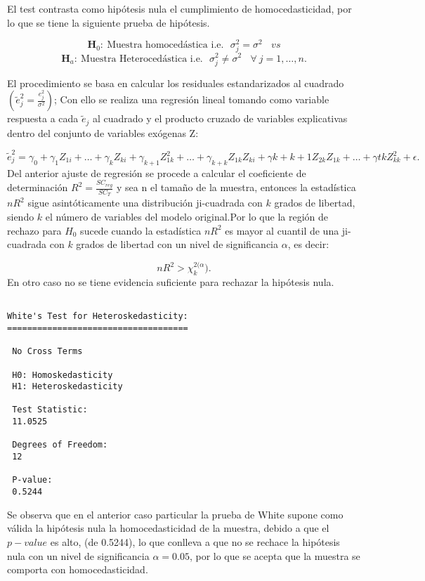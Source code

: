 \documentclass[
  a4paper,
  oneside,
  openany]{book}
\begin{document}
El test contrasta como hipótesis nula el cumplimiento de homocedasticidad, por lo que se tiene la siguiente prueba de hipótesis.

\[\textbf{H}_0: \  \mbox{Muestra homocedástica  i.e.}  \ \ \  \sigma^2_{j}=\sigma^2 \ \ \ \ vs \]
\[\textbf{H}_a: \  \mbox{Muestra Heterocedástica i.e.}  \ \ \  \sigma^2_{j} \neq \sigma^2  \ \ \ \ \forall  \ j = 1,\ldots,n.\]

El procedimiento se basa en calcular los residuales estandarizados al cuadrado \(\left( \tilde{e}^2_{j}=\frac{e^2_{j}}{\sigma^2}\right)\); Con ello se realiza una regresión lineal tomando como variable respuesta a cada \(\tilde{e}_{j}\) al cuadrado y el producto cruzado de variables explicativas dentro del conjunto de variables exógenas Z:

\[\tilde{e}_{j}^{2}=\gamma_{0}+\gamma_{1}Z_{1i}+ \ldots + \gamma_{k}Z_{ki}+\gamma_{k+1}Z^2_{1k}+\ldots + \gamma_{k+k}Z_{1k}Z_{ki}+\gamma{k+k+1}Z_{2k}Z_{1k}+\ldots + \gamma{tk}Z^2_{kk}+\epsilon.\]
Del anterior ajuste de regresión se procede a calcular el coeficiente de determinación \(R^2=\frac{SC_{reg}}{SC_{T}}\) y sea n el tamaño de la muestra, entonces la estadística \(nR^2\) sigue asintóticamente una distribución ji-cuadrada con \(k\) grados de libertad, siendo \(k\) el número de variables del modelo original.Por lo que la región de rechazo para \(H_0\) sucede cuando la estadística \(nR^2\) es mayor al cuantil de una ji-cuadrada con \(k\) grados de libertad con un nivel de significancia \(\alpha\), es decir:

\[nR^2>\chi^{2(\alpha}_{k}).\]
En otro caso no se tiene evidencia suficiente para rechazar la hipótesis nula.

\begin{verbatim}

White's Test for Heteroskedasticity:
==================================== 

 No Cross Terms

 H0: Homoskedasticity
 H1: Heteroskedasticity

 Test Statistic:
 11.0525 

 Degrees of Freedom:
 12 

 P-value:
 0.5244 
\end{verbatim}

Se observa que en el anterior caso particular la prueba de White supone como válida la hipótesis nula la homocedasticidad de la muestra, debido a que el \(p-value\) es alto, (de 0.5244), lo que conlleva a que no se rechace la hipótesis nula con un nivel de significancia \(\alpha=0.05\), por lo que se acepta que la muestra se comporta con homocedasticidad.
\end{document}
